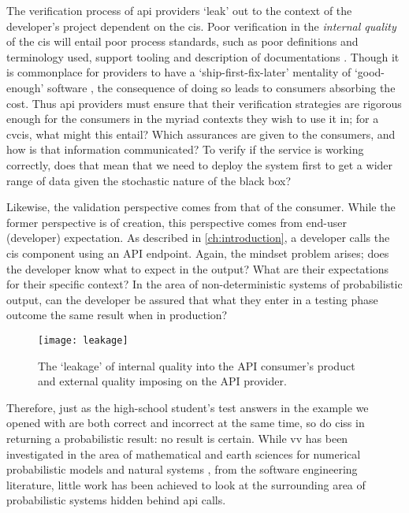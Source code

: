 The verification process of \gls{api} providers `leak' out to the context of the developer's project dependent on the \gls{cis}. Poor verification in the \textit{internal quality} of the \gls{cis} will entail poor process standards, such as poor definitions and terminology used, support tooling and description of documentations \citep{Sommerville:2011uc}. Though it is commonplace for providers to have a `ship-first-fix-later' mentality of `good-enough' software \citep{Venners:2003vw}, the consequence of doing so leads to consumers absorbing the cost. Thus \gls{api} providers must ensure that their verification strategies are rigorous enough for the consumers in the myriad contexts they wish to use it in; for a \gls{cvcis}, what might this entail? Which assurances are given to the consumers, and how is that information communicated? To verify if the service is working correctly, does that mean that we need to deploy the system first to get a wider range of data given the stochastic nature of the black box?

Likewise, the validation perspective comes from that of the consumer. While the former perspective is of creation, this perspective comes from end-user (developer) expectation. As described in \cref{ch:introduction}, a developer calls the \gls{cis} component using an API endpoint. Again, the mindset problem arises; does the developer know what to expect in the output? What are their expectations for their specific context? In the area of non-deterministic systems of probabilistic output, can the developer be assured that what they enter in a testing phase outcome the same result when in production?

\begin{figure}[hbt]
  \centering
  \texttt{[image: leakage]}
  \caption[Leakage of internal and external quality in CISs]{The `leakage' of internal quality into the API consumer's product and external quality imposing on the API provider.}
  \label{fig:background:software-quality:v-and-v:leakage}
\end{figure}

Therefore, just as the high-school student's test answers in the example we opened with are both correct and incorrect at the same time, so do \glspl{cis} in returning a probabilistic result: no result is certain. While \gls{vv} has been investigated in the area of mathematical and earth sciences for numerical probabilistic models and natural systems \citep{Oreskes:1994gn,Rutten:2004a}, from the software engineering literature, little work has been achieved to look at the surrounding area of probabilistic systems hidden behind \gls{api} calls. 

